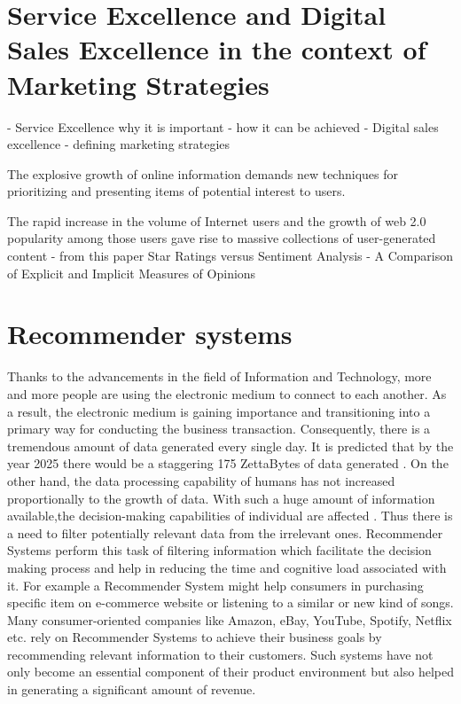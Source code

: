 \section{Service Excellence and Digital Sales Excellence in the context of Marketing Strategies}
- Service Excellence why it is important
- how it can be achieved
- Digital sales excellence
- defining marketing strategies

The explosive growth of online information demands new
techniques for prioritizing and presenting items of potential interest to users.

The rapid increase in the volume of Internet users
and the growth of web 2.0 popularity among those
users gave rise to massive collections of user-generated
content - from this paper Star Ratings versus Sentiment Analysis - A Comparison of Explicit and Implicit Measures of Opinions


\section{Recommender systems}
Thanks to the advancements in the field of Information and Technology, more and more people are using the electronic medium to connect to each another. As a result, the electronic medium is gaining importance and transitioning into a primary way for conducting the business transaction. Consequently, there is a tremendous amount of data generated every single day. It is predicted that by the year 2025 there would be a staggering 175 ZettaBytes of data generated \autocite[3]{Reinsel2018}. On the other hand, the data processing capability of humans has not increased proportionally to the growth of data. With such a huge amount of information available,the decision-making capabilities of individual are affected \autocite[338]{Speier1997}. Thus there is a need to filter potentially relevant data from the irrelevant ones. Recommender Systems perform this task of filtering information which facilitate the decision making process and help in reducing the time and cognitive load associated with it. For example a Recommender System might help consumers in purchasing specific item on e-commerce website or listening to a similar or new kind of songs. Many consumer-oriented companies like Amazon, eBay, YouTube, Spotify, Netflix etc. rely on Recommender Systems to achieve their business goals by recommending relevant information to their customers. Such systems have not only become an essential component of their product environment but also helped in generating a significant amount of revenue.  \\ \par

